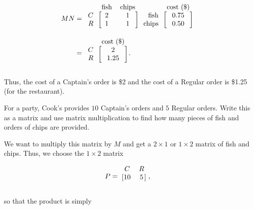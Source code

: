 \documentclass[../gatm_answers.tex]{subfiles}
\begin{document}
\begin{align*}
MN &= \begin{blockarray}{rcc}
& \text{fish} & \text{chips} \\
\begin{block}{r[cc]}
C & 2 & 1 \\
R & 1 & 1 \\
\end{block}
\end{blockarray}\begin{blockarray}{rc}
& \text{cost (\$)} \\
\begin{block}{r[c]}
\text{fish} & 0.75 \\
\text{chips} & 0.50 \\
\end{block}
\end{blockarray} \\
&= \begin{blockarray}{rc}
& \text{cost (\$)} \\
\begin{block}{r[c]}
C & 2 \\
R & 1.25 \\
\end{block}
\end{blockarray}.
\end{align*}

Thus, the cost of a Captain's order is \$2 and the cost of a Regular order is \$1.25 (for the restaurant).

\begin{inner_problem}
\item For a party, Cook's provides $10$ Captain's orders and $5$ Regular orders. Write this as a matrix and use matrix multiplication to find how many pieces of fish and orders of chips are provided.
\end{inner_problem}

We want to multiply this matrix by $M$ and get a $2\times 1$ or $1\times 2$ matrix of fish and chips. Thus, we choose the $1\times 2$ matrix

$$P=\begin{blockarray}{cc}
C & R \\
\begin{block}{[cc]}
10 & 5 \\
\end{block}
\end{blockarray},$$

so that the product is simply
\end{document}
